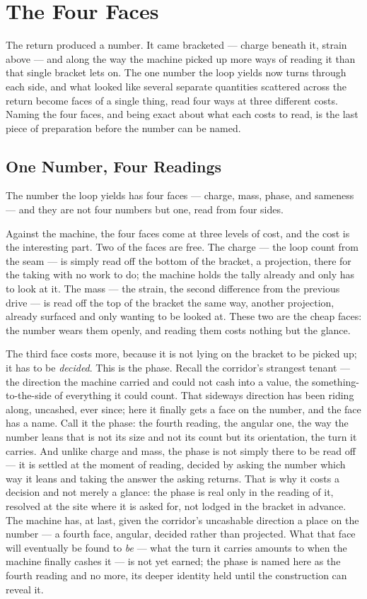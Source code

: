 \chapter{The Four Faces}

The return produced a number. It came bracketed --- charge beneath it, strain above --- and along the way the
machine picked up more ways of reading it than that single bracket lets on. The one number the loop yields now
turns through each side, and what looked like several separate quantities scattered across the return become faces
of a single thing, read four ways at three different costs. Naming the four faces, and being exact about what each
costs to read, is the last piece of preparation before the number can be named.

\section{One Number, Four Readings}

The number the loop yields has four faces --- charge, mass, phase, and sameness --- and they are not four numbers
but one, read from four sides.

Against the machine, the four faces come at three levels of cost, and the cost is the interesting part. Two of the
faces are free. The charge --- the loop count from the seam --- is simply read off the bottom of the bracket, a
projection, there for the taking with no work to do; the machine holds the tally already and only has to look at
it. The mass --- the strain, the second difference from the previous drive --- is read off the top of the bracket
the same way, another projection, already surfaced and only wanting to be looked at. These two are the cheap
faces: the number wears them openly, and reading them costs nothing but the glance.

The third face costs more, because it is not lying on the bracket to be picked up; it has to be \emph{decided}.
This is the phase. Recall the corridor's strangest tenant --- the direction the machine carried and could not
cash into a value, the something-to-the-side of everything it could count. That sideways direction has been riding
along, uncashed, ever since; here it finally gets a face on the number, and the face has a name. Call it the
phase: the fourth reading, the angular one, the way the number leans that is not its size and not its count but
its orientation, the turn it carries. And unlike charge and mass, the phase is not simply there to be read off ---
it is settled at the moment of reading, decided by asking the number which way it leans and taking the answer the
asking returns. That is why it costs a decision and not merely a glance: the phase is real only in the reading of
it, resolved at the site where it is asked for, not lodged in the bracket in advance. The machine has, at last,
given the corridor's uncashable direction a place on the number --- a fourth face, angular, decided rather than
projected. What that face will eventually be found to \emph{be} --- what the turn it carries amounts to when the
machine finally cashes it --- is not yet earned; the phase is named here as the fourth reading and no more, its
deeper identity held until the construction can reveal it.

